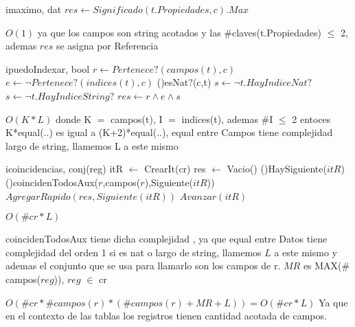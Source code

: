 \begin{Algoritmos}
  \begin{algoritmo}{imaximo}{, }{dat}
    $res \gets Significado(t.Propiedades,c).Max$ 
  \end{algoritmo}
  \datosAlgoritmo{} %
  {} %
  {} %
  {$ O(1)$} %
  {ya que los campos son string acotados y las $\#$claves(t.Propiedades) $\leq$ 2, ademas $res$ se asigna por Referencia} %


  \begin{algoritmo}{ipuedoIndexar}{, }{bool}
  $r \gets Pertenece?(campos(t), c) $ 
  $e \gets \neg Pertenece?(indices(t), c) $ 
  \eIf(){esNat?(c,t)}{
    	$s \gets \neg t.HayIndiceNat?$ 
    }{
    	$s \gets \neg t.HayIndiceString?$ 
    }
    $res \gets r \land e \land s $ 
  \end{algoritmo}
  \datosAlgoritmo{} %
  {} %
  {} %
  {$O(K* L)$} %
  {donde K $=$ campos(t), I $=$ indices(t), ademas \#I $\leq$ 2 entoces K*equal(..) es igual a (K+2)*equal(..), equal entre Campos tiene complejidad largo de string, llamemos L a este mismo} %

  \begin{algoritmo}{icoincidencias}{, }{conj(reg)}
  itR $\gets$ CrearIt(cr) 
  res $\gets$ Vacio()  
  \While(){HaySiguiente($itR$)}{
  	\If(){coincidenTodosAux($r$,campos($r$),Siguiente($itR$))}{
    	$AgregarRapido(res, Siguiente(itR))$ 
    }
  	$Avanzar(itR) $ 
  }
  \end{algoritmo}
  \datosAlgoritmo{} %
  {} %
  {} %
  {$O(\#cr * L)$} %
  {coincidenTodosAux tiene dicha complejidad , ya que equal entre Datos tiene complejidad del orden 1 si es nat o largo de string, llamemos $L$ a este mismo y ademas el conjunto que se usa para llamarlo son los campos de r. $MR$ es MAX($\#$campos($reg$)), $reg$ $\in$ cr

$O(\#cr*\#campos(r)*(\#campos(r)+MR+L)) = O(\#cr * L)$
Ya que en el contexto de las tablas los registros tienen cantidad acotada de campos.} %
  


\end{Algoritmos}
